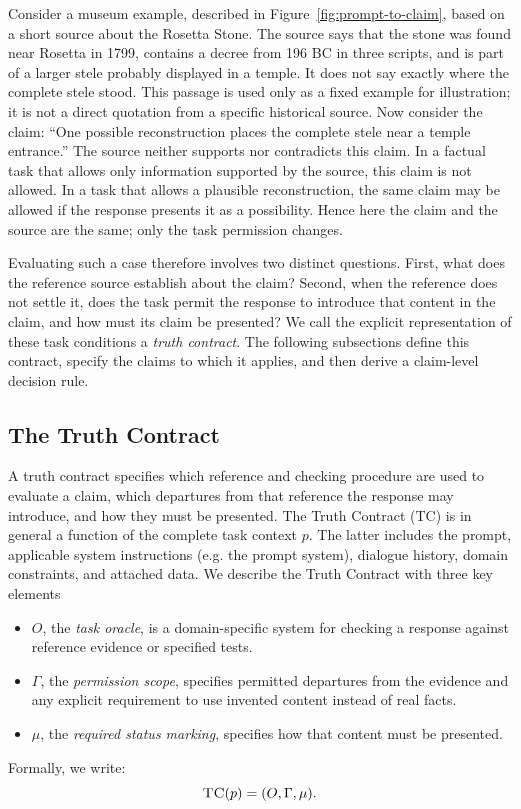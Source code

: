 \documentclass{clv2025}
\newcommand{\TC}{\textsc{TC}}
\begin{document}
 Consider a museum example, described in Figure~\ref{fig:prompt-to-claim}, based on a short source about the Rosetta Stone. 
 The source says that the stone was found near Rosetta in 1799, 
 contains a decree from 196 BC in three scripts, and is part of a larger stele probably displayed in a temple. 
 It does not say exactly where the complete stele stood. 
 This passage is used only as a fixed example for illustration; it is not a direct quotation from a specific historical source.
Now consider the claim: ``One possible reconstruction places the complete stele near a temple entrance.'' 
The source neither supports nor contradicts this claim. 
In a factual task that allows only information supported by the source, 
this claim is not allowed. In a task that allows a plausible reconstruction, 
the same claim may be allowed if the response presents it as a possibility. 
Hence here the claim and the source are the same; only the task permission changes.

Evaluating such a case therefore involves two distinct questions. 
First, what does the reference source establish about the claim? 
Second, when the reference does not settle it, does the task permit the response to introduce that content in the claim, 
and how must its claim be presented? We call the explicit representation of these task conditions a \emph{truth contract}. 
The following subsections define this contract, specify the claims to which it applies, 
and then derive a claim-level decision rule. 

\subsection{The Truth Contract}\label{subsec:contract}
A truth contract specifies which reference and checking procedure are used to evaluate a claim, which departures from that
reference the response may introduce, and how they must be presented.
The Truth Contract (TC) is in general a function of the complete task context $p$. The latter includes the prompt, applicable system instructions (e.g. the prompt system), dialogue
history, domain constraints, and attached data.
We describe the Truth Contract with three key elements

\begin{itemize}
\item $O$, the \emph{task oracle}, is a domain-specific system for checking a response against reference evidence or specified tests.
\item $\Gamma$, the \emph{permission scope}, specifies permitted departures from the evidence and any explicit requirement to use invented content instead of real facts.
\item $\mu$, the \emph{required status marking}, specifies how that content must be presented.
\end{itemize}
Formally, we write:
\begin{equation}
\TC(p)=(O,\Gamma,\mu).
\label{eq:truth-contract}
\end{equation}
\end{document}
